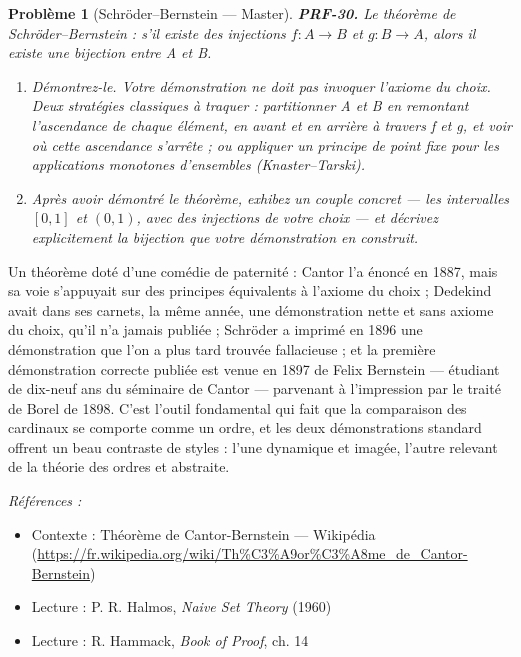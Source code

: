\documentclass[11pt]{article}
\newtheorem{problem}{Problème}
\newenvironment{refs}{\par\small\noindent\emph{Références :}\begin{itemize}\setlength\itemsep{0pt}}{\end{itemize}\normalsize}
\begin{document}
\bigskip

\begin{problem}[{Schröder--Bernstein --- Master}]
\textbf{PRF-30.} Le théorème de Schröder--Bernstein : s'il existe des injections
$ f\colon A \to B $ et $ g\colon B \to A $, alors il existe une bijection entre A et
B.
\begin{enumerate}
\item[(a)] Démontrez-le. Votre démonstration ne doit pas invoquer l'axiome du choix. Deux
stratégies classiques à traquer : partitionner A et B en remontant l'ascendance de chaque
élément, en avant et en arrière à travers f et g, et voir où cette ascendance s'arrête ; ou
appliquer un principe de point fixe pour les applications monotones d'ensembles
(Knaster--Tarski).
\item[(b)] Après avoir démontré le théorème, exhibez un couple concret --- les intervalles
$ [0,1] $ et $ (0,1) $, avec des injections de votre choix --- et décrivez explicitement
la bijection que votre démonstration en construit.
\end{enumerate}

\end{problem}

\noindent Un théorème doté d'une comédie de paternité : Cantor l'a énoncé en 1887,
mais sa voie s'appuyait sur des principes équivalents à l'axiome du choix ; Dedekind avait
dans ses carnets, la même année, une démonstration nette et sans axiome du choix, qu'il n'a
jamais publiée ; Schröder a imprimé en 1896 une démonstration que l'on a plus tard trouvée
fallacieuse ; et la première démonstration correcte publiée est venue en 1897 de Felix
Bernstein --- étudiant de dix-neuf ans du séminaire de Cantor --- parvenant à l'impression par le
traité de Borel de 1898. C'est l'outil fondamental qui fait que la comparaison des cardinaux
se comporte comme un ordre, et les deux démonstrations standard offrent un beau contraste de
styles : l'une dynamique et imagée, l'autre relevant de la théorie des ordres et
abstraite.

\begin{refs}
\item Contexte : Théorème de Cantor-Bernstein --- Wikipédia (\url{https://fr.wikipedia.org/wiki/Th%C3%A9or%C3%A8me_de_Cantor-Bernstein})
\item Lecture : P. R. Halmos, \textit{Naive Set Theory} (1960)
\item Lecture : R. Hammack, \textit{Book of Proof}, ch. 14
\end{refs}
\end{document}
